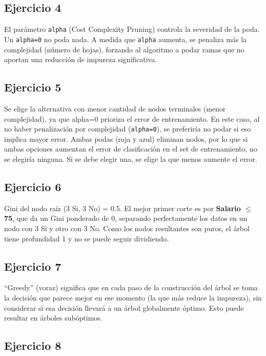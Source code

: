 \documentclass[12pt]{article}
\begin{document}
\subsection{Ejercicio 4}

El parámetro \texttt{alpha} (Cost Complexity Pruning) controla la severidad de la poda. Un \texttt{alpha=0} no poda nada. A medida que \texttt{alpha} aumenta, se penaliza más la complejidad (número de hojas), forzando al algoritmo a podar ramas que no aportan una reducción de impureza significativa.

\subsection{Ejercicio 5}

Se elige la alternativa con menor cantidad de nodos terminales (menor complejidad), ya que alpha=0 prioriza el error de entrenamiento. En este caso, al no haber penalización por complejidad (\texttt{alpha=0}), se preferiría no podar si eso implica mayor error. Ambas podas (roja y azul) eliminan nodos, por lo que si ambas opciones aumentan el error de clasificación en el set de entrenamiento, no se elegiría ninguna. Si se debe elegir una, se elige la que menos aumente el error.

\subsection{Ejercicio 6}

Gini del nodo raíz (3 Si, 3 No) = 0.5.
  El mejor primer corte es por \textbf{Salario \(\leq\) 75}, que da un Gini ponderado de 0, separando perfectamente los datos en un nodo con 3 Si y otro con 3 No. Como los nodos resultantes son puros, el árbol tiene profundidad 1 y no se puede seguir dividiendo.

\subsection{Ejercicio 7}

``Greedy'' (voraz) significa que en cada paso de la construcción del árbol se toma la decisión que parece mejor en ese momento (la que más reduce la impureza), sin considerar si esa decisión llevará a un árbol globalmente óptimo. Esto puede resultar en árboles subóptimos.

\subsection{Ejercicio 8}
\end{document}
